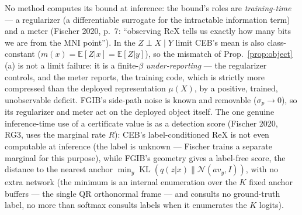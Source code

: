 \begin{remark}\label{rem:training-role}
No method computes its bound at inference: the bound's roles are \emph{training-time}
--- a regularizer (a differentiable surrogate for the intractable information term) and
a meter (Fischer 2020, p.~7: ``observing ReX tells us exactly how many bits we are from
the MNI point''). In the $Z \perp X \mid Y$ limit CEB's mean is also class-constant
($m(x) = \mathbb{E}[Z|x] = \mathbb{E}[Z|y]$), so the mismatch of
Prop.~\ref{prop:object}(a) is not a limit failure: it is a finite-$\beta$
\emph{under-reporting} --- the regularizer controls, and the meter reports, the training
code, which is strictly more compressed than the deployed representation $\mu(X)$, by a
positive, trained, unobservable deficit. FGIB's side-path noise is known and removable
($\sigma_p \to 0$), so its regularizer and meter act on the deployed object itself.
The one genuine inference-time use of a certificate value is as a detection score
(Fischer 2020, RG3, uses the marginal rate $R$): CEB's label-conditioned
$\mathrm{ReX}$ is not even computable at inference (the label is unknown --- Fischer
trains a separate marginal for this purpose), while FGIB's geometry gives a label-free
score, the distance to the nearest anchor
$\min_y \operatorname{KL}(q(z|x)\|\mathcal{N}(a v_y, I))$, with no extra network
(the minimum is an internal enumeration over the $K$ fixed anchor buffers --- the single
QR orthonormal frame --- and consults no ground-truth label, no more than softmax
consults labels when it enumerates the $K$ logits).
\end{remark}

